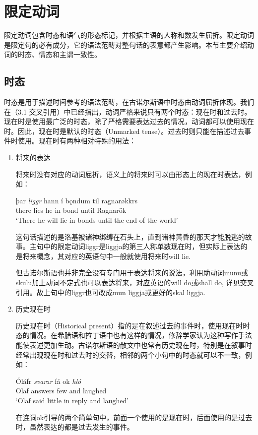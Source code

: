 \section{限定动词}
限定动词包含时态和语气的形态标记，并根据主语的人称和数发生屈折。限定动词是限定句的必有成分，它的语法范畴对整句话的表意都产生影响。本节主要介绍动词的时态、情态和主谓一致性。
\subsection{时态}
时态是用于描述时间参考的语法范畴，在古诺尔斯语中时态由动词屈折体现。我们在（3.1 交叉引用）中已经指出，动词严格来说只有两个时态：现在时和过去时。现在时是使用最广泛的时态，除了严格需要表达过去的情况，动词都可以使用现在时。因此，现在时是默认的时态（Unmarked tense）。过去时则只能在描述过去事件时使用。现在时有两种相对特殊的用法：
\begin{enumerate}
    \setlength{\parindent}{2em}
    \item 将来的表达

          将来时没有对应的动词屈折，语义上的将来时可以由形态上的现在时表达，例如：
          \begin{exe}
              \ex
              \gll þar	\textit{liggr}	hann	í	bǫndum	til	ragnarøkkrs\\
              there	lies	he	in	bond	until	Ragnarök\\
              \trans `There he will lie in bonds until the end of the world'
          \end{exe}


          这句话描述的是洛基被诸神绑缚在石头上，直到诸神黄昏的那天才能脱逃的故事。主句中的限定动词liggr是liggja的第三人称单数现在时，但实际上表达的是将来概念，其对应的英语句中一般就使用将来时will lie.

          但古诺尔斯语也并非完全没有专门用于表达将来的说法，利用助动词munu或skulu加上动词不定式也可以表达将来，对应英语的will do或shall do, 详见交叉引用。故上句中的liggr也可改成mun liggja或更好的skal liggja.

    \item 历史现在时

          历史现在时（Historical present）指的是在叙述过去的事件时，使用现在时时态的情况。在希腊语和拉丁语中也有这样的情况，修辞学家认为这种写作手法能使表述更加生动。古诺尔斯语的散文中也常有历史现在时，特别是在叙事时经常出现现在时和过去时的交替，相邻的两个小句中的时态就可以不一致，例如：

          \begin{exe}
              \ex
              \gll  Óláfr	\textit{svarar}	fá	ok	\textit{hló}\\
              Olaf	answers	few	and	laughed\\
              \trans `Olaf said little in reply and laughed’
          \end{exe}

          在连词ok引导的两个简单句中，前面一个使用的是现在时，后面使用的是过去时，虽然表达的都是过去发生的事件。

\end{enumerate}
